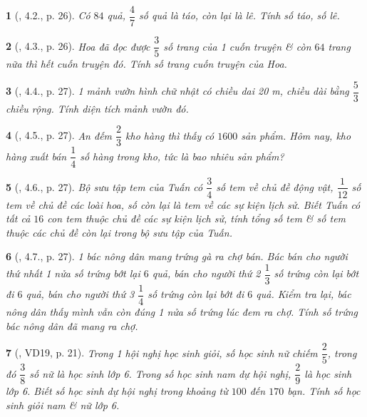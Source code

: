 \documentclass{article}
\newtheorem{baitoan}{}
\begin{document}
\begin{baitoan}[\cite{Binh_boi_duong_Toan_6_tap_2}, 4.2., p. 26]
	Có $84$ quả, $\dfrac{4}{7}$ số quả là táo, còn lại là lê. Tính số táo, số lê.
\end{baitoan}

\begin{baitoan}[\cite{Binh_boi_duong_Toan_6_tap_2}, 4.3., p. 26]
	Hoa đã đọc được $\dfrac{3}{5}$ số trang của 1 cuốn truyện \& còn $64$ trang nữa thì hết cuốn truyện đó. Tính số trang cuốn truyện của Hoa.
\end{baitoan}

\begin{baitoan}[\cite{Binh_boi_duong_Toan_6_tap_2}, 4.4., p. 27]
	1 mảnh vườn hình chữ nhật có chiều dai {\rm20 m}, chiều dài bằng $\dfrac{5}{3}$ chiều rộng. Tính diện tích mảnh vườn đó.
\end{baitoan}

\begin{baitoan}[\cite{Binh_boi_duong_Toan_6_tap_2}, 4.5., p. 27]
	An đếm $\dfrac{2}{3}$ kho hàng thì thấy có $1600$ sản phẩm. Hôm nay, kho hàng xuất bán $\dfrac{1}{4}$ số hàng trong kho, tức là bao nhiêu sản phẩm?
\end{baitoan}

\begin{baitoan}[\cite{Binh_boi_duong_Toan_6_tap_2}, 4.6., p. 27]
	Bộ sưu tập tem của Tuấn có $\dfrac{3}{4}$ số tem về chủ đề động vật, $\dfrac{1}{12}$ số tem về chủ đề các loài hoa, số còn lại là tem về các sự kiện lịch sử. Biết Tuấn có tất cả $16$ con tem thuộc chủ đề các sự kiện lịch sử, tính tổng số tem \& số tem thuộc các chủ đề còn lại trong bộ sưu tập của Tuấn.
\end{baitoan}

\begin{baitoan}[\cite{Binh_boi_duong_Toan_6_tap_2}, 4.7., p. 27]
	1 bác nông dân mang trứng gà ra chợ bán. Bác bán cho người thứ nhất 1 nửa số trứng bớt lại $6$ quả, bán cho người thứ 2 $\dfrac{1}{3}$ số trứng còn lại bớt đi $6$ quả, bán cho người thứ 3 $\dfrac{1}{4}$ số trứng còn lại bớt đi $6$ quả. Kiểm tra lại, bác nông dân thấy mình vẫn còn đúng 1 nửa số trứng lúc đem ra chợ. Tính số trứng bác nông dân đã mang ra chợ.
\end{baitoan}

\begin{baitoan}[\cite{Binh_Toan_6_tap_2}, VD19, p. 21]
	Trong 1 hội nghị học sinh giỏi, số học sinh nữ chiếm $\dfrac{2}{5}$, trong đó $\dfrac{3}{8}$ số nữ là học sinh lớp 6. Trong số học sinh nam dự hội nghị, $\dfrac{2}{9}$ là học sinh lớp 6. Biết số học sinh dự hội nghị trong khoảng từ $100$ đến $170$ bạn. Tính số học sinh giỏi nam \& nữ lớp 6.
\end{baitoan}
\end{document}

